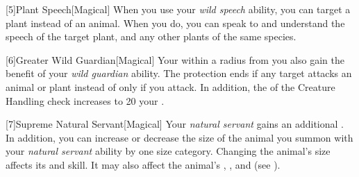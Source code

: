         [5]{Plant Speech}[Magical] When you use your \textit{wild speech} ability, you can target a plant instead of an animal.
        When you do, you can speak to and understand the speech of the target plant, and any other plants of the same species.

        [6]{Greater Wild Guardian}[Magical] Your  within a \arealarge radius  from you also gain the benefit of your \textit{wild guardian} ability.
        The protection ends if any target attacks an animal or plant instead of only if you attack.
        In addition, the  of the Creature Handling check increases to 20 \add your .

        [7]{Supreme Natural Servant}[Magical] Your \textit{natural servant} gains an additional .
        In addition, you can increase or decrease the size of the animal you summon with your \textit{natural servant} ability by one size category.
        Changing the animal's size affects its  and  skill.
        It may also affect the animal's , , and  (see ).


